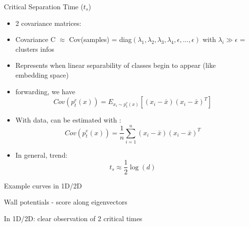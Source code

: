 \documentclass[aspectratio=169]{beamer}
\begin{document}
\begin{frame}{Critical Separation Time ($t_s$)}
    \begin{itemize}
    
        \item 2 covariance matrices:
        
        \item Covariance C $\approx$ Cov(samples) = diag$(\lambda_1, \lambda_2, \lambda_3, \lambda_4, \epsilon, ..., \epsilon)$ with $\lambda_i \gg \epsilon$ = clusters infos
        
        \item Represents when linear separability of classes begin to appear (like embedding space)
        
        \item forwarding, we have 
        \begin{equation}
            Cov(p_t^e(x)) = E_{x_i \sim p_t^e(x)} [(x_i - \bar{x})(x_i - \bar{x})^T]
        \end{equation}
        
        \item With data, can be estimated with :
        \begin{equation}
            Cov(p_t^e(x)) = \frac{1}{n} \sum_{i=1}^n (x_i - \bar{x})(x_i - \bar{x})^T
        \end{equation}
        
        \item In general, trend:
        \begin{equation}
            t_s \approx \frac{1}{2}\log(d)
        \end{equation}
    \end{itemize}
\end{frame}
    

\begin{frame}{Example curves in 1D/2D}
    
    \item Wall potentials - score along eigenvectors
    \item In 1D/2D: clear observation of 2 critical times
    \begin{center}
    \end{center}
\end{frame}
\end{document}
